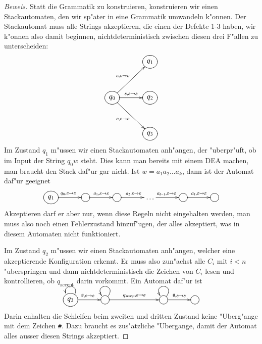 \begin{proof}[Beweis]
Statt die Grammatik zu konstruieren, konstruieren wir einen Stackautomaten,
den wir sp"ater in eine Grammatik umwandeln k"onnen.
Der Stackautomat
muss alle Strings akzeptieren, die einen der Defekte 1-3 haben, wir
k"onnen also damit beginnen, nichtdeterministisch zwischen diesen drei
F"allen zu unterscheiden:
\[
\entrymodifiers={++[o][F]}
\xymatrix @+3mm{
*+\txt{}
	&q_1
\\
q_0	\ar[ur]^{\varepsilon,\varepsilon\to\varepsilon}
	\ar[r]^{\varepsilon,\varepsilon\to\varepsilon}
	\ar[dr]_{\varepsilon,\varepsilon\to\varepsilon}
	&q_2
\\
*+\txt{}
	&q_3
}
\]
Im Zustand $q_1$ m"ussen wir einen Stackautomaten anh"angen, der
"uberpr"uft, ob im Input der String $q_0w$ steht.
Dies kann man 
bereits mit einem DEA machen, man braucht den Stack daf"ur gar nicht.
Ist $w=a_1a_2\dots a_k$, dann ist der Automat daf"ur geeignet
\[
\xymatrix @+3mm{
*++[o][F]{q_1}\ar[r]^{q_0,\varepsilon\to\varepsilon}
	&*++[o][F]{}\ar[r]^{a_1,\varepsilon\to\varepsilon}
		&*++[o][F]{}\ar[r]^{a_2,\varepsilon\to\varepsilon}
			&\dots\ar[r]^{a_{k-1},\varepsilon\to\varepsilon}
				&*++[o][F]{}\ar[r]^{a_k,\varepsilon\to\varepsilon}
					&*++[o][F]{}
}
\]
Akzeptieren darf er aber nur, wenn diese Regeln nicht eingehalten
werden, man muss also noch einen Fehlerzustand hinzuf"ugen, der
alles akzeptiert, was in diesem Automaten nicht funktioniert.

Im Zustand $q_2$ m"ussen wir einen Stackautomaten anh"angen, welcher
eine akzeptierende Konfiguration erkennt.
Er muss also zun"achst 
alle $C_i$ mit $i<n$ "uberspringen und dann nichtdeterministisch
die Zeichen von $C_i$ lesen und kontrollieren, ob $q_{\text{accept}}$
darin vorkommt.
Ein Automat daf"ur ist 
\[
\entrymodifiers={++[o][F]}
\xymatrix @+3mm{
q_2\ar@(ur,ul)
	\ar[r]^{{\tt\#},\varepsilon\to\varepsilon}
	&{}\ar@(ur,ul)
		\ar[rr]^{q_{\text{accept}},\varepsilon\to\varepsilon}
		&*+\txt{}
			&{}\ar@(ur,ul)
				\ar[r]^{{\tt\#},\varepsilon\to\varepsilon}
				&*++[o][F]{}
}
\]
Darin enhalten die Schleifen beim zweiten und dritten Zustand keine
"Uberg"ange mit dem Zeichen {\tt\#}.
Dazu braucht es zus"atzliche
"Ubergange, damit der Automat alles ausser diesen Strings akzeptiert.


\end{proof}
